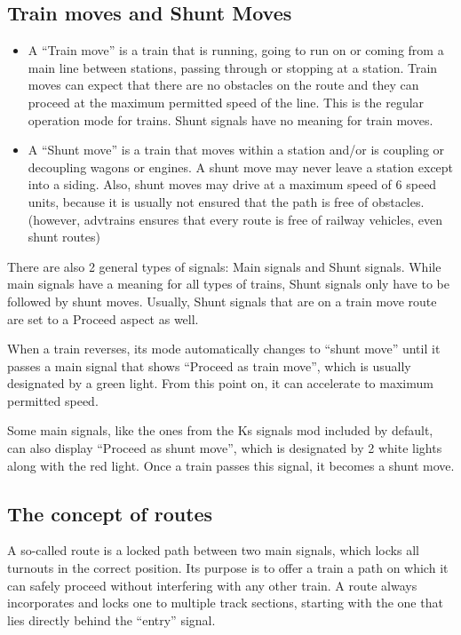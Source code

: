 \documentclass[english]{paper}
\begin{document}
\subsection{Train moves and Shunt Moves}
\begin{itemize}
\item A ``Train move'' is a train that is running, going to run on or
coming from a main line between stations, passing through or stopping
at a station. Train moves can expect that there are no obstacles on
the route and they can proceed at the maximum permitted speed of the
line. This is the regular operation mode for trains. Shunt signals
have no meaning for train moves.
\item A ``Shunt move'' is a train that moves within a station and/or is
coupling or decoupling wagons or engines. A shunt move may never leave
a station except into a siding. Also, shunt moves may drive at a maximum
speed of 6 speed units, because it is usually not ensured that the
path is free of obstacles. (however, advtrains ensures that every
route is free of railway vehicles, even shunt routes)
\end{itemize}
There are also 2 general types of signals: Main signals and Shunt
signals. While main signals have a meaning for all types of trains,
Shunt signals only have to be followed by shunt moves. Usually, Shunt
signals that are on a train move route are set to a Proceed aspect
as well.

When a train reverses, its mode automatically changes to ``shunt
move'' until it passes a main signal that shows ``Proceed as train
move'', which is usually designated by a green light. From this point
on, it can accelerate to maximum permitted speed.

Some main signals, like the ones from the Ks signals mod included
by default, can also display ``Proceed as shunt move'', which is
designated by 2 white lights along with the red light. Once a train
passes this signal, it becomes a shunt move.

\subsection{The concept of routes}

A so-called route is a locked path between two main signals, which
locks all turnouts in the correct position. Its purpose is to offer
a train a path on which it can safely proceed without interfering
with any other train. A route always incorporates and locks one to
multiple track sections, starting with the one that lies directly
behind the ``entry'' signal.
\end{document}
